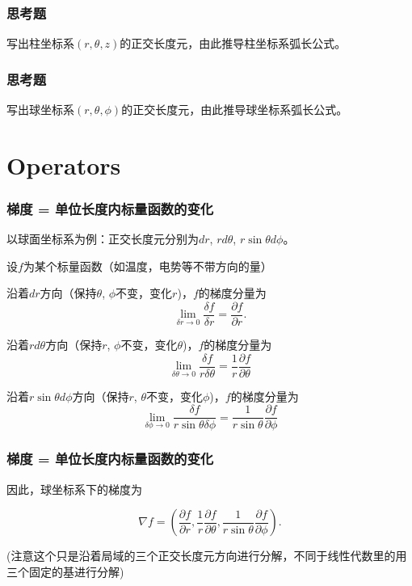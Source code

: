 \documentclass[CJK]{beamer}
\begin{document}
\begin{frame}
\frametitle{思考题}



写出柱坐标系$(r,\theta, z)$的正交长度元，由此推导柱坐标系弧长公式。


\end{frame}


\begin{frame}
\frametitle{思考题}



写出球坐标系$(r,\theta, \phi)$的正交长度元，由此推导球坐标系弧长公式。


\end{frame}

\section{Operators}


\begin{frame}
  \frametitle{梯度 = 单位长度内标量函数的变化}
  
  以球面坐标系为例：正交长度元分别为$dr$, $rd\theta$, $r\sin\theta d\phi$。

  \skipline

  设$f$为某个标量函数（如温度，电势等不带方向的量）

  \bitem

\item{沿着$dr$方向（保持$\theta$, $\phi$不变，变化$r$)，$f$的梯度分量为
    $$\lim_{\delta r\rightarrow 0}\frac{\delta f}{\delta r} = \frac{\partial f}{\partial r}.$$}

\item{沿着$rd\theta$方向（保持$r$, $\phi$不变，变化$\theta$)，$f$的梯度分量为
  $$\lim_{\delta \theta \rightarrow 0}\frac{\delta f}{r\delta \theta} = \frac{1}{r}\frac{\partial f}{\partial \theta}$$}

\item{沿着$r\sin\theta d\phi$方向（保持$r$, $\theta$不变，变化$\phi$)，$f$的梯度分量为
  $$\lim_{\delta \phi \rightarrow 0}\frac{\delta f}{r\sin\theta \delta \phi} = \frac{1}{r\sin\theta}\frac{\partial f}{\partial \phi}$$}
  
    \eitem

  
\end{frame}



\begin{frame}
  \frametitle{梯度 = 单位长度内标量函数的变化}
  

  因此，球坐标系下的梯度为

  $$\nabla f = \left(\frac{\partial f}{\partial r}, \frac{1}{r}\frac{\partial f}{\partial \theta}, \frac{1}{r\sin\theta}\frac{\partial f}{\partial \phi} \right).$$

  \skiplines
  
  (注意这个只是沿着局域的三个正交长度元方向进行分解，不同于线性代数里的用三个固定的基进行分解)
  
\end{frame}
\end{document}
